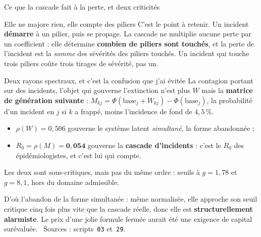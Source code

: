 \documentclass[11pt]{beamer}
\begin{document}
\begin{frame}{Ce que la cascade fait à la perte, et deux criticités}
\scriptsize
\begin{block}{Elle ne majore rien, elle compte des piliers}
C'est le point à retenir. Un incident \textbf{démarre} à un pilier, puis se propage. La cascade ne
multiplie aucune perte par un coefficient : elle détermine \textbf{combien de piliers sont
touchés}, et la perte de l'incident est la \emph{somme} des sévérités des piliers touchés. Un
incident qui touche trois piliers coûte trois tirages de sévérité, pas un.
\end{block}
\vspace{-1mm}
\begin{block}{Deux rayons spectraux, et c'est la confusion que j'ai évitée}
La contagion portant sur des incidents, l'objet qui gouverne l'extinction n'est plus $W$ mais la
\textbf{matrice de génération suivante} : $M_{kj} = \Phi(\text{base}_j + W_{kj}) -
\Phi(\text{base}_j)$, la probabilité d'un incident en $j$ si $k$ a frappé, moins l'incidence de
fond de $4{,}5\,\%$.
\begin{itemize}\itemsep1pt
\item $\rho(W) = 0{,}506$ gouverne le système latent \emph{simultané}, la forme abandonnée ;
\item $R_0 = \rho(M) = \mathbf{0{,}054}$ gouverne la \textbf{cascade d'incidents} : c'est le
  $R_0$ des épidémiologistes, et c'est lui qui compte.
\end{itemize}
Les deux sont sous-critiques, mais pas du même ordre : seuils à $g = 1{,}78$ et $g = 8{,}1$, hors
du domaine admissible.
\end{block}
\vspace{-1mm}
{\scriptsize D'où l'abandon de la forme simultanée : même normalisée, elle approche son seuil
critique cinq fois plus vite que la cascade réelle, donc elle est \textbf{structurellement
alarmiste}. Le prix d'une jolie formule fermée aurait été une exigence de capital surévaluée.
\ Sources : scripts~\texttt{03} et~\texttt{29}.}
\end{frame}
\end{document}
